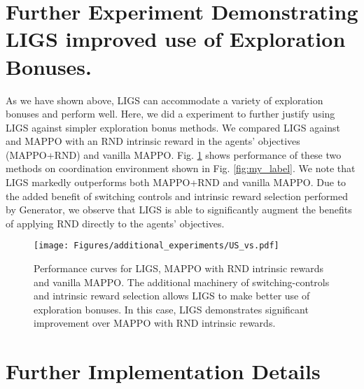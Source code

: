 \documentclass{article}
\begin{document}


\newpage
\section{Further Experiment Demonstrating LIGS improved use of Exploration Bonuses.}
As we have shown above, LIGS can accommodate a variety of exploration bonuses and perform well. Here, we did a experiment to further justify using LIGS against simpler exploration bonus methods. We compared LIGS against and MAPPO with an RND  intrinsic reward in the agents' objectives (MAPPO+RND) and vanilla MAPPO. Fig. \ref{fig:us_vs} shows performance of these two methods on coordination environment shown in Fig. \ref{fig:my_label}. We note that LIGS markedly outperforms both MAPPO+RND and vanilla MAPPO. Due to the added benefit of switching controls and intrinsic reward selection performed by {\selectfont Generator}, we observe that LIGS is able to significantly augment the benefits of applying RND directly to the agents' objectives.

\begin{figure}[h!]
    \centering
\texttt{[image: Figures/additional\_experiments/US\_vs.pdf]}
    \caption{Performance curves for LIGS, MAPPO with RND intrinsic rewards and vanilla MAPPO. The additional machinery of switching-controls and intrinsic reward selection allows LIGS to make better use of exploration bonuses. In this case, LIGS demonstrates significant improvement over MAPPO with RND intrinsic rewards.}
    \label{fig:us_vs}
\end{figure}

\newpage
\section{Further Implementation Details}\label{sec:app_imp_details}

\end{document}

